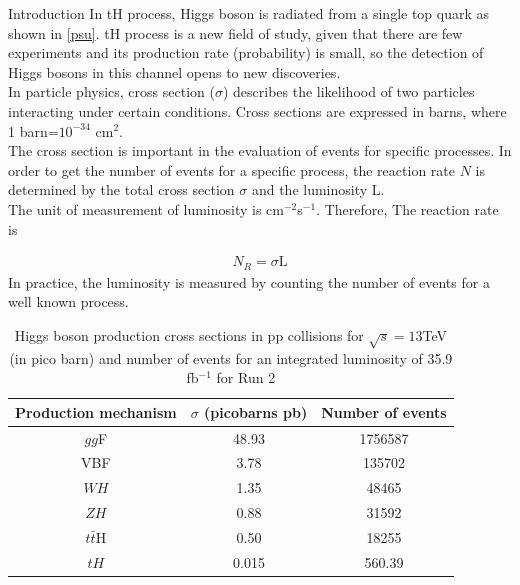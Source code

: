 \begin{chapter}{Introduction}
In tH process, Higgs boson is radiated from a single top quark as shown in \ref{psu}. tH process is a new field of study, given that there are few experiments and its production rate (probability) is small, so the detection of Higgs bosons in this channel opens to new discoveries.
\\

In particle physics, cross section ($\sigma$) describes the likelihood of two particles interacting under certain conditions.
 Cross sections are expressed in barns, where 1 barn=$10^{-34}$ cm$^{2}$.
\\
The cross section is important in the evaluation of events for specific processes. In order to get the number of events for a specific process, the reaction rate $N$ is determined by the total cross section $\sigma$ and the luminosity L.\\
The unit of measurement of luminosity is cm$^{-2}$s$^{-1}$. Therefore, The reaction rate is 

\begin{align} \label{nr}
N_R=\sigma \text{L}
\end{align}
In practice, the luminosity is measured by counting the number of events for a well known process.

\begin{table}[ht]
\centering
\caption[Higgs boson production cross sections in pp collisions for $\sqrt{s}=13$TeV (in pico barn) and number of events for an integrated luminosity of 35.9 fb$^{-1}$ for Run 2]{	Higgs boson production cross sections in pp collisions for $\sqrt{s}=13$TeV (in pico barn) and number of events for an integrated luminosity of 35.9 fb$^{-1}$ for Run 2 \protect \cite{pd}}
\begin{tabular}{|c|c|c|}
\hline
Production mechanism &
$\sigma$ (picobarns pb) & Number of events \\
\hline
$gg$F & 48.93 & 1756587\\
\hline
VBF & 3.78 & 135702\\
\hline
$WH$ & 1.35 & 48465\\
\hline
$ZH$ &0.88 & 31592\\
\hline
$t\bar{t}$H & 0.50 & 18255\\
\hline
$tH$	& 0.015 & 560.39\\
\hline
\end{tabular}
\label{crt}
\end{table}


\end{chapter}
